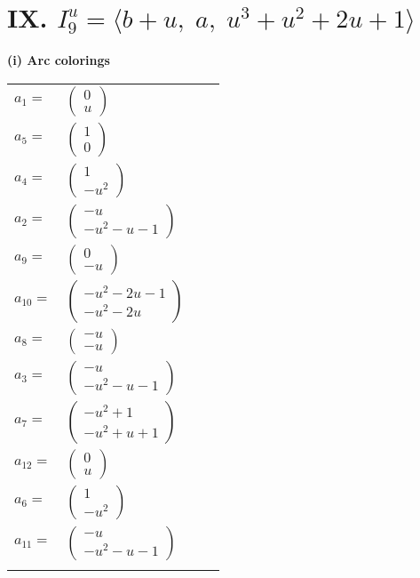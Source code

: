 \documentclass[1p]{elsarticle_modified}
\theoremstyle{definition}
\begin{document}
\centering \section*{IX. $I^u_{9}= \langle b+u,\;a,\;u^3+u^2+2 u+1 \rangle$}
\flushleft \textbf{(i) Arc colorings}\\
\begin{tabular}{m{7pt} m{180pt} m{7pt} m{180pt} }
\flushright $a_{1}=$&$\begin{pmatrix}0\\u\end{pmatrix}$ \\
\flushright $a_{5}=$&$\begin{pmatrix}1\\0\end{pmatrix}$ \\
\flushright $a_{4}=$&$\begin{pmatrix}1\\- u^2\end{pmatrix}$ \\
\flushright $a_{2}=$&$\begin{pmatrix}- u\\- u^2- u-1\end{pmatrix}$ \\
\flushright $a_{9}=$&$\begin{pmatrix}0\\- u\end{pmatrix}$ \\
\flushright $a_{10}=$&$\begin{pmatrix}- u^2-2 u-1\\- u^2-2 u\end{pmatrix}$ \\
\flushright $a_{8}=$&$\begin{pmatrix}- u\\- u\end{pmatrix}$ \\
\flushright $a_{3}=$&$\begin{pmatrix}- u\\- u^2- u-1\end{pmatrix}$ \\
\flushright $a_{7}=$&$\begin{pmatrix}- u^2+1\\- u^2+u+1\end{pmatrix}$ \\
\flushright $a_{12}=$&$\begin{pmatrix}0\\u\end{pmatrix}$ \\
\flushright $a_{6}=$&$\begin{pmatrix}1\\- u^2\end{pmatrix}$ \\
\flushright $a_{11}=$&$\begin{pmatrix}- u\\- u^2- u-1\end{pmatrix}$\\&\end{tabular}
\end{document}
